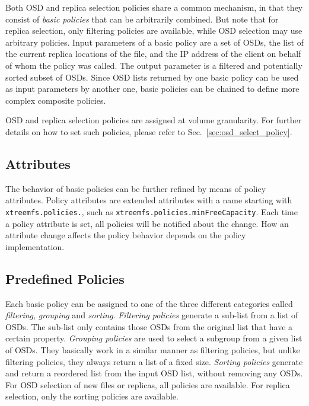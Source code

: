 \documentclass[a4paper,10pt]{book}
\begin{document}
Both OSD and replica selection policies share a common mechanism, in that they consist of \emph{basic policies} that can be arbitrarily combined. But note that for replica selection, only filtering policies are available, while OSD selection may use arbitrary policies. Input parameters of a basic policy are a set of OSDs, the list of the current replica locations of the file, and the IP address of the client on behalf of whom the policy was called. The output parameter is a filtered and potentially sorted subset of OSDs. Since OSD lists returned by one basic policy can be used as input parameters by another one, basic policies can be chained to define more complex composite policies.

OSD and replica selection policies are assigned at volume granularity. For further details on how to set such policies, please refer to Sec.\ \ref{sec:osd_select_policy}.

\subsection{Attributes}

The behavior of basic policies can be further refined by means of policy attributes. Policy attributes are extended attributes with a name starting with \texttt{xtreemfs.policies.}, such as \texttt{xtreemfs.policies.minFreeCapacity}. Each time a policy attribute is set, all policies will be notified about the change. How an attribute change affects the policy behavior depends on the policy implementation.

\subsection{Predefined Policies}
\label{sec:predefinedPolicies}

Each basic policy can be assigned to one of the three different categories called \emph{filtering}, \emph{grouping} and \emph{sorting}. \emph{Filtering policies} generate a sub-list from a list of OSDs. The sub-list only contains those OSDs from the original list that have a certain property. \emph{Grouping policies} are used to select a subgroup from a given list of OSDs. They basically work in a similar manner as filtering policies, but unlike filtering policies, they always return a list of a fixed size. \emph{Sorting policies} generate and return a reordered list from the input OSD list, without removing any OSDs. For OSD selection of new files or replicas, all policies are available. For replica selection, only the sorting policies are available.
\end{document}
